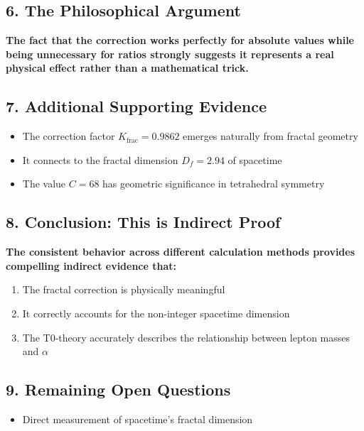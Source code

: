 \documentclass[12pt,a4paper]{article}
\theoremstyle{definition}
\begin{document}
\subsection*{6. The Philosophical Argument}

\begin{tcolorbox}[colback=blue!5!white,colframe=blue!75!black]
	\textbf{The fact that the correction works perfectly for absolute values while being unnecessary for ratios strongly suggests it represents a real physical effect rather than a mathematical trick.}
\end{tcolorbox}

\subsection*{7. Additional Supporting Evidence}

\begin{itemize}
	\item The correction factor $K_{\text{frac}} = 0.9862$ emerges naturally from fractal geometry
	\item It connects to the fractal dimension $D_f = 2.94$ of spacetime
	\item The value $C = 68$ has geometric significance in tetrahedral symmetry
\end{itemize}

\subsection*{8. Conclusion: This is Indirect Proof}

\begin{tcolorbox}[colback=red!5!white,colframe=red!75!black]
	\textbf{The consistent behavior across different calculation methods provides compelling indirect evidence that:}
	\begin{enumerate}
		\item The fractal correction is physically meaningful
		\item It correctly accounts for the non-integer spacetime dimension
		\item The T0-theory accurately describes the relationship between lepton masses and $\alpha$
	\end{enumerate}
\end{tcolorbox}

\subsection*{9. Remaining Open Questions}

\begin{itemize}
	\item Direct measurement of spacetime's fractal dimension
	

\end{itemize}
	
\end{document}
